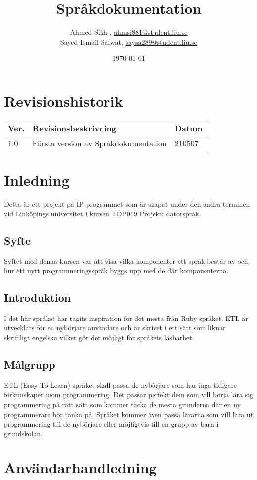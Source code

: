 \documentclass{TDP019mall}
\author{Ahmed Sikh , \url{ahmsi881@student.liu.se}\\
Sayed Ismail Safwat, \url{saysa289@student.liu.se}}
\title{Språkdokumentation}
\date{\today}
\begin{document}
\projectpage
\tableofcontents
\newpage
\section{Revisionshistorik}
\begin{table}[!h]
\begin{tabularx}{\linewidth}{|l|X|l|}
\hline
Ver. & Revisionsbeskrivning & Datum \\\hline
1.0 & Första version av Språkdokumentation & 210507 \\\hline
\end{tabularx}
\end{table}



\section{Inledning}
Detta är ett projekt på IP-programmet som är skapat under den andra terminen vid Linköpings universitet i kursen TDP019 Projekt: datorspråk.

\subsection{Syfte}
Syftet med denna kursen var att visa vilka komponenter ett språk består av och hur ett nytt programmeringsspråk byggs upp med de där komponenterna. 

\subsection{Introduktion}
I det här språket har tagits inspiration för det mesta från Ruby språket. ETL är utvecklats för en nybörjare användare och är skrivet i ett sätt som 
liknar skriftligt engelska vilket gör det möjligt för språkets läsbarhet.

\subsection{Målgrupp}
ETL (Easy To Learn) språket skall passa de nybörjare som har inga tidigare förkunskaper inom programmering. Det passar perfekt dem som vill börja lära 
sig programmering på rätt sätt som kommer täcka de mesta grunderna där en ny programmerare bör tänka på. Språket kommer även passa lärarna som vill lära
ut programmering till de nybörjare eller möjligtvis till en grupp av barn i grundskolan.


\section{Användarhandledning}
\end{document}
